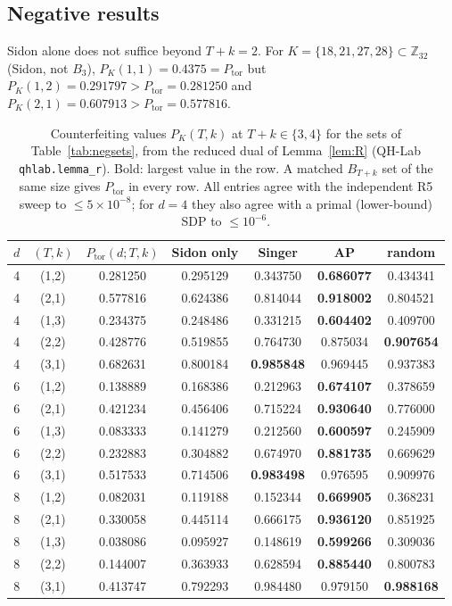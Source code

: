 \documentclass[11pt]{article}
\newcommand{\Z}{\mathbb{Z}}
\newcommand{\Ptor}{P_{\mathrm{tor}}}
\theoremstyle{definition}
\theoremstyle{remark}
\begin{document}
\subsection{Negative results}\label{sec:neg}
Sidon alone does not suffice beyond $T+k=2$. For $K=\{18,21,27,28\}\subset\Z_{32}$ (Sidon, not $B_3$),
$P_K(1,1)=0.4375=\Ptor$ but $P_K(1,2)=0.291797>\Ptor=0.281250$ and $P_K(2,1)=0.607913>\Ptor=0.577816$.
\begin{table}[tbp]\centering\small
\caption{Counterfeiting values $P_K(T,k)$ at $T+k\in\{3,4\}$ for the sets of Table~\ref{tab:negsets}, from the reduced dual of Lemma~\ref{lem:R} (QH-Lab \texttt{qhlab.lemma\_r}). Bold: largest value in the row. A matched $B_{T+k}$ set of the same size gives $\Ptor$ in every row. All entries agree with the independent R5 sweep to $\le5\times10^{-8}$; for $d=4$ they also agree with a primal (lower-bound) SDP to $\le10^{-6}$.}\label{tab:neg}
\begin{tabular}{cc c cccc}\toprule
$d$ & $(T,k)$ & $\Ptor(d;T,k)$ & Sidon only & Singer & AP & random\\\midrule
4 & (1,2) & 0.281250 & 0.295129 & 0.343750 & \textbf{0.686077} & 0.434341\\
4 & (2,1) & 0.577816 & 0.624386 & 0.814044 & \textbf{0.918002} & 0.804521\\
4 & (1,3) & 0.234375 & 0.248486 & 0.331215 & \textbf{0.604402} & 0.409700\\
4 & (2,2) & 0.428776 & 0.519855 & 0.764730 & 0.875034 & \textbf{0.907654}\\
4 & (3,1) & 0.682631 & 0.800184 & \textbf{0.985848} & 0.969445 & 0.937383\\
\midrule
6 & (1,2) & 0.138889 & 0.168386 & 0.212963 & \textbf{0.674107} & 0.378659\\
6 & (2,1) & 0.421234 & 0.456406 & 0.715224 & \textbf{0.930640} & 0.776000\\
6 & (1,3) & 0.083333 & 0.141279 & 0.212560 & \textbf{0.600597} & 0.245909\\
6 & (2,2) & 0.232883 & 0.304882 & 0.674970 & \textbf{0.881735} & 0.669629\\
6 & (3,1) & 0.517533 & 0.714506 & \textbf{0.983498} & 0.976595 & 0.909976\\
\midrule
8 & (1,2) & 0.082031 & 0.119188 & 0.152344 & \textbf{0.669905} & 0.368231\\
8 & (2,1) & 0.330058 & 0.445114 & 0.666175 & \textbf{0.936120} & 0.851925\\
8 & (1,3) & 0.038086 & 0.095927 & 0.148619 & \textbf{0.599266} & 0.309036\\
8 & (2,2) & 0.144007 & 0.363933 & 0.628594 & \textbf{0.885440} & 0.800783\\
8 & (3,1) & 0.413747 & 0.792293 & 0.984480 & 0.979150 & \textbf{0.988168}\\
\bottomrule
\end{tabular}
\end{table}
\end{document}
